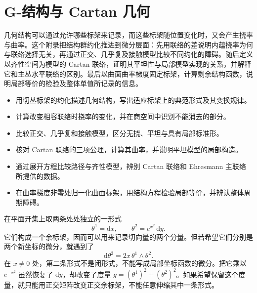 
% 
% 
% 
% 
% 
% 

\chapter{G-结构与 Cartan 几何}
\label{g1:app:D}

\begin{chapterabstract}
	几何结构可以通过允许哪些标架来记录，而这些标架随位置变化时，又会产生挠率与曲率。这个附录把结构群约化推进到微分层面：先用联络的差说明内蕴挠率为何与联络选择无关，再通过正交、几乎复及接触模型比较不同约化的障碍。随后定义以齐性空间为模型的 Cartan 联络，证明其平坦性与局部模型实现的关系，并解释它和主丛水平联络的区别。最后以曲面曲率梯度固定标架，计算剩余结构函数，说明局部等价的检验及整体单值所记录的信息。
\end{chapterabstract}

\begin{learninggoals}
	\begin{itemize}
		\item 用切丛标架的约化描述几何结构，写出适应标架上的典范形式及其变换规律。
		\item 计算改变相容联络时挠率的变化，并在商空间中识别不能消去的部分。
		\item 比较正交、几乎复和接触模型，区分无挠、平坦与具有局部标准形。
		\item 核对 Cartan 联络的三项公理，计算其曲率，并说明平坦模型的局部构造。
		\item 通过展开方程比较路径与齐性模型，辨别 Cartan 联络和 Ehresmann 主联络所提供的数据。
		\item 在曲率梯度非零处归一化曲面标架，用结构方程检验局部等价，并辨认整体周期障碍。
	\end{itemize}
\end{learninggoals}

在平面开集上取两条处处独立的一形式
\[
	\theta^1=\mathrm{d}x,\qquad \theta^2=e^{x^2}\,\mathrm{d}y.
\]
它们构成一个余标架，因而可以用来记录切向量的两个分量。但若希望它们分别是两个新坐标的微分，就遇到了
\[
	\mathrm{d}\theta^2=2x\,\theta^1\wedge\theta^2.
\]
在 \(x\ne0\) 处，第二条形式不是闭形式，不能写成局部坐标函数的微分。把它乘以 \(e^{-x^2}\) 虽然恢复了 \(\mathrm{d}y\)，却改变了度量 \(g=(\theta^1)^2+(\theta^2)^2\)。如果希望保留这个度量，就只能用正交矩阵改变正交余标架，不能任意伸缩其中一条形式。

